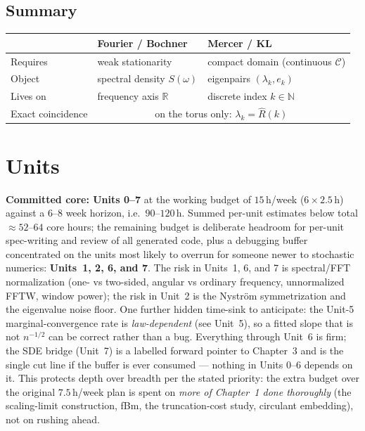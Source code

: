 \documentclass[11pt]{article}
\begin{document}
\subsection{Summary}

\begin{center}
\begin{tabular}{@{}p{3.1cm}p{4.3cm}p{4.3cm}@{}}
\toprule
& \textbf{Fourier / Bochner} & \textbf{Mercer / KL} \\
\midrule
Requires & weak stationarity & compact domain (continuous $\mathcal{C}$) \\
Object & spectral density $S(\omega)$ & eigenpairs $(\lambda_k,e_k)$ \\
Lives on & frequency axis $\mathbb{R}$ & discrete index $k\in\mathbb{N}$ \\
Exact coincidence & \multicolumn{2}{c}{on the torus only: $\lambda_k=\hat R(k)$} \\
\bottomrule
\end{tabular}
\end{center}

\section{Units}

\textbf{Committed core: Units 0--7} at the working budget of $15$\,h/week ($6\times 2.5$\,h) against a $6$--$8$ week horizon, i.e.\ $90$--$120$\,h. Summed per-unit estimates below total $\approx 52$--$64$ core hours; the remaining budget is deliberate headroom for per-unit spec-writing and review of all generated code, plus a debugging buffer concentrated on the units most likely to overrun for someone newer to stochastic numerics: \textbf{Units~1, 2, 6, and 7}. The risk in Units~1, 6, and 7 is spectral/FFT normalization (one- vs two-sided, angular vs ordinary frequency, unnormalized FFTW, window power); the risk in Unit~2 is the Nystr\"om symmetrization and the eigenvalue noise floor. One further hidden time-sink to anticipate: the Unit-5 marginal-convergence rate is \emph{law-dependent} (see Unit~5), so a fitted slope that is not $n^{-1/2}$ can be correct rather than a bug. Everything through Unit~6 is firm; the SDE bridge (Unit~7) is a labelled forward pointer to Chapter~3 and is the single cut line if the buffer is ever consumed --- nothing in Units 0--6 depends on it. This protects depth over breadth per the stated priority: the extra budget over the original $7.5$\,h/week plan is spent on \emph{more of Chapter~1 done thoroughly} (the scaling-limit construction, fBm, the truncation-cost study, circulant embedding), not on rushing ahead.
\end{document}
